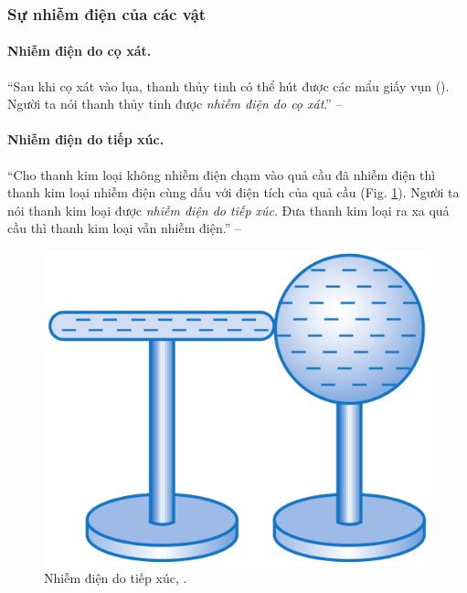 \documentclass[oneside]{book}
\numberwithin{equation}{section}
\begin{document}
\subsubsection{Sự nhiễm điện của các vật}

\paragraph{Nhiễm điện do cọ xát.} ``Sau khi cọ xát vào lụa, thanh thủy tinh có thể hút được các mẩu giấy vụn (\cite[Hình 1.2: \textsf{Thanh thủy tin nhiễm điện hút các mẩu giấy}, p. 6]{SGK_Vat_Ly_11_nang_cao}). Người ta nói thanh thủy tinh được \textit{nhiễm điện do cọ xát}.'' -- \cite[p. 6]{SGK_Vat_Ly_11_nang_cao}

\paragraph{Nhiễm điện do tiếp xúc.} ``Cho thanh kim loại không nhiễm điện chạm vào quả cầu đã nhiễm điện thì thanh kim loại nhiễm điện cùng dấu với điện tích của quả cầu (Fig. \ref{fig:nhiem_dien_do_tiep_xuc}). Người ta nói thanh kim loại được \textit{nhiễm điện do tiếp xúc}. Đưa thanh kim loại ra xa quả cầu thì thanh kim loại vẫn nhiễm điện.'' -- \cite[p. 7]{SGK_Vat_Ly_11_nang_cao}

\begin{figure}[H]
	\centering
	\includegraphics[scale=0.15]{nhiem_dien_do_tiep_xuc}
	\caption{Nhiễm điện do tiếp xúc, \cite[Hình 1.3, p. 7]{SGK_Vat_Ly_11_nang_cao}.}
	\label{fig:nhiem_dien_do_tiep_xuc}
\end{figure}
\end{document}
